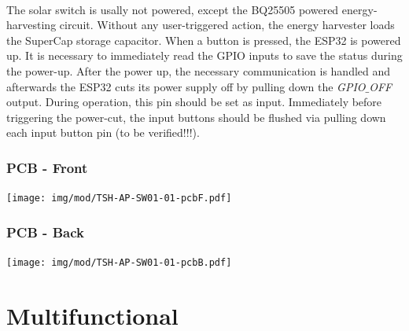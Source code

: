 \documentclass[]{scrreprt}%
\begin{document}
\hfill \\

The solar switch is usally not powered, except the BQ25505 powered energy-harvesting circuit. Without any user-triggered action,
the energy harvester loads the SuperCap storage capacitor. When a button is pressed, the ESP32 is powered up. It is necessary to immediately read the GPIO inputs to save the 
status during the power-up.
After the power up, the necessary communication is handled and afterwards the ESP32 cuts its power supply off by pulling down the \textit{GPIO$\_$OFF} output. During operation,
this pin should be set as input. Immediately before triggering the power-cut, the input buttons should be flushed via pulling down each input button pin (to be verified!!!).


\subsubsection{PCB - Front}

\texttt{[image: img/mod/TSH-AP-SW01-01-pcbF.pdf]}

\subsubsection{PCB - Back}

\texttt{[image: img/mod/TSH-AP-SW01-01-pcbB.pdf]}

\section{Multifunctional}



\end{document}
